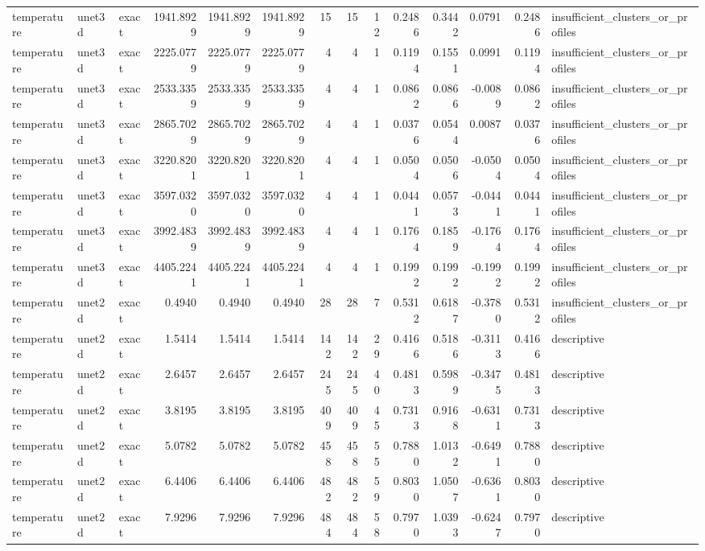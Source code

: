 \begin{tabular}{lllrrrrrrrrrrl}
temperature & unet3d & exact & 1941.8929 & 1941.8929 & 1941.8929 & 15 & 15 & 12 & 0.2486 & 0.3442 & 0.0791 & 0.2486 & insufficient_clusters_or_profiles \\
temperature & unet3d & exact & 2225.0779 & 2225.0779 & 2225.0779 & 4 & 4 & 1 & 0.1194 & 0.1551 & 0.0991 & 0.1194 & insufficient_clusters_or_profiles \\
temperature & unet3d & exact & 2533.3359 & 2533.3359 & 2533.3359 & 4 & 4 & 1 & 0.0862 & 0.0866 & -0.0089 & 0.0862 & insufficient_clusters_or_profiles \\
temperature & unet3d & exact & 2865.7029 & 2865.7029 & 2865.7029 & 4 & 4 & 1 & 0.0376 & 0.0544 & 0.0087 & 0.0376 & insufficient_clusters_or_profiles \\
temperature & unet3d & exact & 3220.8201 & 3220.8201 & 3220.8201 & 4 & 4 & 1 & 0.0504 & 0.0506 & -0.0504 & 0.0504 & insufficient_clusters_or_profiles \\
temperature & unet3d & exact & 3597.0320 & 3597.0320 & 3597.0320 & 4 & 4 & 1 & 0.0441 & 0.0573 & -0.0441 & 0.0441 & insufficient_clusters_or_profiles \\
temperature & unet3d & exact & 3992.4839 & 3992.4839 & 3992.4839 & 4 & 4 & 1 & 0.1764 & 0.1859 & -0.1764 & 0.1764 & insufficient_clusters_or_profiles \\
temperature & unet3d & exact & 4405.2241 & 4405.2241 & 4405.2241 & 4 & 4 & 1 & 0.1992 & 0.1992 & -0.1992 & 0.1992 & insufficient_clusters_or_profiles \\
temperature & unet2d & exact & 0.4940 & 0.4940 & 0.4940 & 28 & 28 & 7 & 0.5312 & 0.6187 & -0.3780 & 0.5312 & insufficient_clusters_or_profiles \\
temperature & unet2d & exact & 1.5414 & 1.5414 & 1.5414 & 142 & 142 & 29 & 0.4166 & 0.5186 & -0.3113 & 0.4166 & descriptive \\
temperature & unet2d & exact & 2.6457 & 2.6457 & 2.6457 & 245 & 245 & 40 & 0.4813 & 0.5989 & -0.3475 & 0.4813 & descriptive \\
temperature & unet2d & exact & 3.8195 & 3.8195 & 3.8195 & 409 & 409 & 45 & 0.7313 & 0.9168 & -0.6311 & 0.7313 & descriptive \\
temperature & unet2d & exact & 5.0782 & 5.0782 & 5.0782 & 458 & 458 & 55 & 0.7880 & 1.0132 & -0.6491 & 0.7880 & descriptive \\
temperature & unet2d & exact & 6.4406 & 6.4406 & 6.4406 & 482 & 482 & 59 & 0.8030 & 1.0507 & -0.6361 & 0.8030 & descriptive \\
temperature & unet2d & exact & 7.9296 & 7.9296 & 7.9296 & 484 & 484 & 58 & 0.7970 & 1.0393 & -0.6247 & 0.7970 & descriptive \\

\end{tabular}

